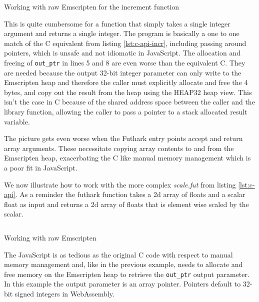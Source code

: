 \documentclass[11pt]{book}
\begin{document}
\begin{listing}[H] 
        \inputminted[fontsize=\small,baselinestretch=0.5,linenos]{JavaScript}{code/compiler/api_examples/raw_incr.js}
        \caption{Working with raw Emscripten for the increment function}
        \label{lst:raw_incr}    
\end{listing} 

This is quite cumbersome for a function that simply takes a single integer argument and returns a single integer.
The program is basically a one to one match of the C equivalent from listing \ref{lst:c-api-incr}, including passing around pointers, which is unsafe and not idiomatic in JavaScript.
The allocation and freeing of \texttt{out\_ptr} in lines 5 and 8 are even worse than the equivalent C. They are needed because the output 32-bit integer parameter can only write to the Emscripten heap and therefore the caller must explicitly allocate and free the 4 bytes, and copy out the result from the heap using the HEAP32 heap view. 
This isn't the case in C because of the shared address space between the caller and the library function, allowing the caller to pass a pointer to a stack allocated result variable.

The picture gets even worse when the Futhark entry points accept and return array arguments.
These necessitate copying array contents to and from the Emscripten heap, exacerbating the C like manual memory management which is a poor fit in JavaScript. 


We now illustrate how to work with the more complex \textit{scale.fut} from listing \ref{lst:c-api}. As a reminder the futhark function takes a 2d array of floats and a scalar float as input and returns a 2d array of floats that is element wise scaled by the scalar. 

\begin{listing}[H] 
        \inputminted[fontsize=\small,baselinestretch=0.5,linenos]{JavaScript}{code/compiler/api_examples/raw.js}
        \caption{Working with raw Emscripten }
        \label{lst:raw}    
\end{listing} 

The JavaScript is as tedious as the original C code with respect to manual memory management and, like in the previous example, needs to allocate and free memory on the Emscripten heap to retrieve the \texttt{out\_ptr} output parameter. In this example the output parameter is an array pointer. Pointers default to 32-bit signed integers in WebAssembly.

\end{document}
